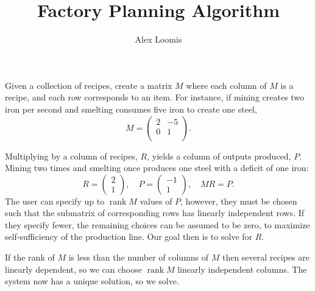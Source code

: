 \documentclass[12pt]{article}
\title{Factory Planning Algorithm}
\author{Alex Loomis}
\newcommand*\inv{^{-1}}
\DeclareMathOperator\rank{rank}
\begin{document}
\maketitle

Given a collection of recipes,
create a matrix $M$ where each column of $M$ is a recipe,
and each row corresponds to an item.
For instance, if mining creates two iron per second
and smelting consumes five iron to create one steel,
\[
  M = \begin{pmatrix}
    2 & -5 \\
    0 & 1 \\
  \end{pmatrix}.
\]

Multiplying by a column of recipes, $R$,
yields a column of outputs produced, $P$.
Mining two times and smelting once produces
one steel with a deficit of one iron:
\[
  R = \begin{pmatrix} 2 \\ 1 \end{pmatrix}, \quad
  P = \begin{pmatrix} -1 \\ 1 \end{pmatrix}, \quad
  MR = P.
\]
The user can specify up to $\rank M$ values of $P$, however,
they must be chosen such that the submatrix of corresponding rows
has linearly independent rows.
If they specify fewer, the remaining choices can be assumed to be zero,
to maximize self-sufficiency of the production line.
Our goal then is to solve for $R$.

If the rank of $M$ is less than the number of columns of $M$
then several recipes are linearly dependent,
so we can choose $\rank M$ linearly independent columns.
The system now has a unique solution, so we solve.

\end{document}
